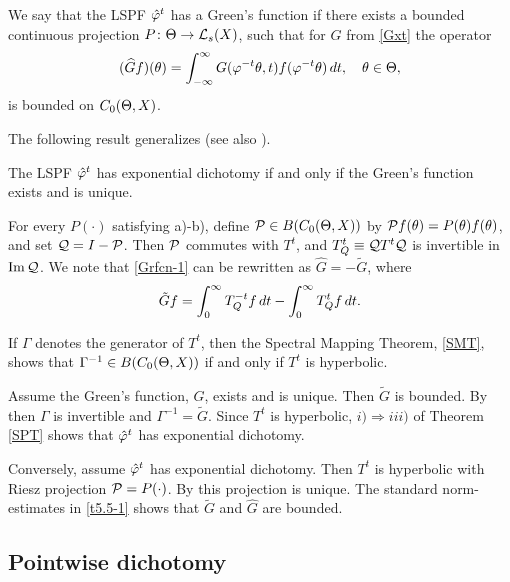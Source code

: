 \begin{defn}  We say that the LSPF ${\hat{\varphi}}^t$ has a Green's function
if there exists a bounded continuous projection $P\colon \Theta\to {\cal{L}}_s(X)$,
such that for $G$ from
\eqref{Gxt}  the operator
\begin{equation}\lb{Grfcn-1}
(\widehat{G}f)(\th) = \int^{\infty}_{-\infty} G(\vphi^{-t}\th,t)
f(\vphi^{-t}\th)\,dt,\quad \th\in \TH,
\end{equation}
is bounded on $C_0(\Theta,X)$.
\end{defn}
The following result generalizes \cite{Sam} (see also
\cite{LATGDDE}).

\begin{thm}
The LSPF ${\hat{\varphi}}^t$ has exponential dichotomy if and only if
the Green's function exists and is unique.
\end{thm}

\begin{pf}
For every $P(\cdot)$ satisfying a)-b), define
${\cal{P}}\in B(C_0(\Theta,X))$ by ${\cal{P}} f(\theta)=P(\theta)f(\theta)$, and set
${\cal{Q}}=I-{\cal{P}}$.  Then ${\cal{P}}$ commutes with $T^t$, and
$T^t_Q\equiv {\cal{Q}} T^t{\cal{Q}}$ is invertible in $\operatorname{Im} {\cal{Q}}$.  We
note that \eqref{Grfcn-1} can be rewritten as
$\widehat{G} = -\tilde{G}$, where
\begin{equation}\lb{t5.5-1}
\tilde{G}f=\int^{\infty}_0 T^{-t}_Qf\,dt
  -\int^{\infty}_0 T^t_Q f\,dt.
\end{equation}

If $\Gamma$ denotes the generator of $T^t$, then the
Spectral Mapping Theorem, \ref{SMT}, shows that
$\Gamma^{-1}\in B(C_0(\Theta,X))$ if and only if $T^t$ is hyperbolic.

Assume the Green's function, $G$, exists and is unique.
Then $\tilde{G}$ is bounded.  By \cite[Lemma 4.2]{LatRand} then
$\Gamma$ is invertible
and $\Gamma^{-1} = \tilde{G}.$  Since $T^t$ is hyperbolic,
$i)\Rightarrow iii)$ of Theorem \ref{SPT} shows that ${\hat{\varphi}}^t$
has exponential dichotomy.

Conversely, assume ${\hat{\varphi}}^t$ has exponential dichotomy.
Then $T^t$ is hyperbolic with Riesz projection ${\cal{P}}=P(\cdot)$.
By \cite{BAG} this projection is unique.  The standard
norm-estimates in \eqref{t5.5-1} shows that $\tilde{G}$ and
$\widehat{G}$ are bounded.
\end{pf}

\subsection{Pointwise dichotomy}

